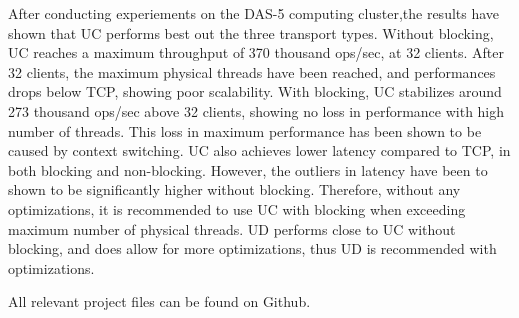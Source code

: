 \begin{abstracts}
    After conducting experiements on the DAS-5 computing cluster,the results have shown that UC performs best out the three transport types.
    Without blocking, UC reaches a maximum throughput of 370 thousand ops/sec, at 32 clients.
    After 32 clients, the maximum physical threads have been reached, and performances drops below TCP, showing poor scalability.
    With blocking, UC stabilizes around 273 thousand ops/sec above 32 clients, showing no loss in performance with high number of threads.
    This loss in maximum performance has been shown to be caused by context switching.
    UC also achieves lower latency compared to TCP, in both blocking and non-blocking.
    However, the outliers in latency have been to shown to be significantly higher without blocking.
    Therefore, without any optimizations, it is recommended to use UC with blocking when exceeding maximum number of physical threads.
    UD performs close to UC without blocking, and does allow for more optimizations, thus UD is recommended with optimizations.

    All relevant project files can be found on Github\cite{github}.

\end{abstracts}


